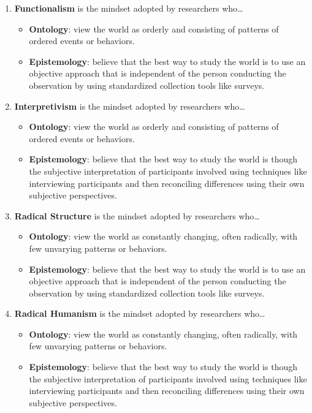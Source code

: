 \documentclass[]{book}
\theoremstyle{definition}
\theoremstyle{definition}
\theoremstyle{definition}
\theoremstyle{remark}
\begin{document}
\begin{enumerate}
\def\labelenumi{\arabic{enumi}.}
\item
  \textbf{Functionalism} is the mindset adopted by researchers
  who\ldots{}

  \begin{itemize}
  \item
    \textbf{Ontology}: view the world as orderly and consisting of
    patterns of ordered events or behaviors.
  \item
    \textbf{Epistemology}: believe that the best way to study the world
    is to use an objective approach that is independent of the person
    conducting the observation by using standardized collection tools
    like surveys.
  \end{itemize}
\item
  \textbf{Interpretivism} is the mindset adopted by researchers
  who\ldots{}

  \begin{itemize}
  \item
    \textbf{Ontology}: view the world as orderly and consisting of
    patterns of ordered events or behaviors.
  \item
    \textbf{Epistemology}: believe that the best way to study the world
    is though the subjective interpretation of participants involved
    using techniques like interviewing participants and then reconciling
    differences using their own subjective perspectives.
  \end{itemize}
\item
  \textbf{Radical Structure} is the mindset adopted by researchers
  who\ldots{}

  \begin{itemize}
  \item
    \textbf{Ontology}: view the world as constantly changing, often
    radically, with few unvarying patterns or behaviors.
  \item
    \textbf{Epistemology}: believe that the best way to study the world
    is to use an objective approach that is independent of the person
    conducting the observation by using standardized collection tools
    like surveys.
  \end{itemize}
\item
  \textbf{Radical Humanism} is the mindset adopted by researchers
  who\ldots{}

  \begin{itemize}
  \item
    \textbf{Ontology}: view the world as constantly changing, often
    radically, with few unvarying patterns or behaviors.
  \item
    \textbf{Epistemology}: believe that the best way to study the world
    is though the subjective interpretation of participants involved
    using techniques like interviewing participants and then reconciling
    differences using their own subjective perspectives.
  \end{itemize}
\end{enumerate}
\end{document}
